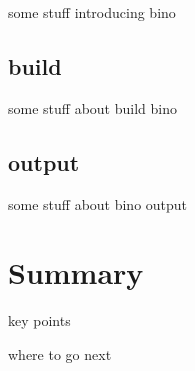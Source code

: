 \documentclass[
]{book}
\begin{document}
some stuff introducing bino

\hypertarget{bino-build}{%
\section{build}\label{bino-build}}

some stuff about build bino

\hypertarget{bino-output}{%
\section{output}\label{bino-output}}

some stuff about bino output

\hypertarget{summary}{%
\chapter{Summary}\label{summary}}

key points

where to go next

  
\end{document}
